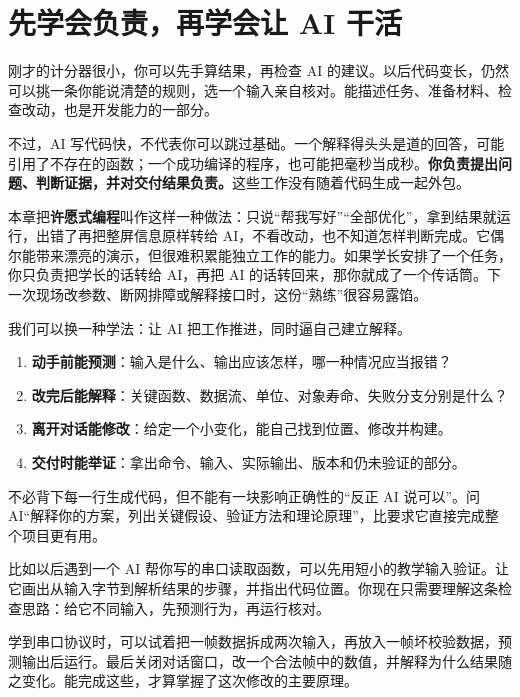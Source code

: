 \section{先学会负责，再学会让 AI 干活}
\label{sec:ai-responsibility}

刚才的计分器很小，你可以先手算结果，再检查 AI 的建议。以后代码变长，仍然可以挑一条你能说清楚的规则，选一个输入亲自核对。能描述任务、准备材料、检查改动，也是开发能力的一部分。

不过，AI 写代码快，不代表你可以跳过基础。一个解释得头头是道的回答，可能引用了不存在的函数；一个成功编译的程序，也可能把毫秒当成秒。\textbf{你负责提出问题、判断证据，并对交付结果负责。}这些工作没有随着代码生成一起外包。

本章把\textbf{许愿式编程}叫作这样一种做法：只说“帮我写好”“全部优化”，拿到结果就运行，出错了再把整屏信息原样转给 AI，不看改动，也不知道怎样判断完成。它偶尔能带来漂亮的演示，但很难积累能独立工作的能力。如果学长安排了一个任务，你只负责把学长的话转给 AI，再把 AI 的话转回来，那你就成了一个传话筒。下一次现场改参数、断网排障或解释接口时，这份“熟练”很容易露馅。

我们可以换一种学法：让 AI 把工作推进，同时逼自己建立解释。
\begin{enumerate}
    \item \textbf{动手前能预测}：输入是什么、输出应该怎样，哪一种情况应当报错？
    \item \textbf{改完后能解释}：关键函数、数据流、单位、对象寿命、失败分支分别是什么？
    \item \textbf{离开对话能修改}：给定一个小变化，能自己找到位置、修改并构建。
    \item \textbf{交付时能举证}：拿出命令、输入、实际输出、版本和仍未验证的部分。
\end{enumerate}
不必背下每一行生成代码，但不能有一块影响正确性的“反正 AI 说可以”。问 AI“解释你的方案，列出关键假设、验证方法和理论原理”，比要求它直接完成整个项目更有用。

\begin{example}
比如以后遇到一个 AI 帮你写的串口读取函数，可以先用短小的教学输入验证。让它画出从输入字节到解析结果的步骤，并指出代码位置。你现在只需要理解这条检查思路：给它不同输入，先预测行为，再运行核对。

学到串口协议时，可以试着把一帧数据拆成两次输入，再放入一帧坏校验数据，预测输出后运行。最后关闭对话窗口，改一个合法帧中的数值，并解释为什么结果随之变化。能完成这些，才算掌握了这次修改的主要原理。
\end{example}

